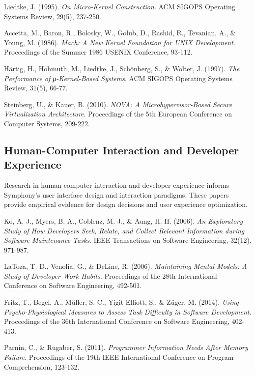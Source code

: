 \begin{compactlist}
    \item Liedtke, J. (1995). \textit{On Micro-Kernel Construction}. ACM SIGOPS Operating Systems Review, 29(5), 237-250.
    \item Accetta, M., Baron, R., Bolosky, W., Golub, D., Rashid, R., Tevanian, A., \& Young, M. (1986). \textit{Mach: A New Kernel Foundation for UNIX Development}. Proceedings of the Summer 1986 USENIX Conference, 93-112.
    \item Härtig, H., Hohmuth, M., Liedtke, J., Schönberg, S., \& Wolter, J. (1997). \textit{The Performance of μ-Kernel-Based Systems}. ACM SIGOPS Operating Systems Review, 31(5), 66-77.
    \item Steinberg, U., \& Kauer, B. (2010). \textit{NOVA: A Microhypervisor-Based Secure Virtualization Architecture}. Proceedings of the 5th European Conference on Computer Systems, 209-222.
\end{compactlist}

\subsection*{Human-Computer Interaction and Developer Experience}

Research in human-computer interaction and developer experience informs Symphony's user interface design and interaction paradigms. These papers provide empirical evidence for design decisions and user experience optimization.

\begin{compactlist}
    \item Ko, A. J., Myers, B. A., Coblenz, M. J., \& Aung, H. H. (2006). \textit{An Exploratory Study of How Developers Seek, Relate, and Collect Relevant Information during Software Maintenance Tasks}. IEEE Transactions on Software Engineering, 32(12), 971-987.
    \item LaToza, T. D., Venolia, G., \& DeLine, R. (2006). \textit{Maintaining Mental Models: A Study of Developer Work Habits}. Proceedings of the 28th International Conference on Software Engineering, 492-501.
    \item Fritz, T., Begel, A., Müller, S. C., Yigit-Elliott, S., \& Züger, M. (2014). \textit{Using Psycho-Physiological Measures to Assess Task Difficulty in Software Development}. Proceedings of the 36th International Conference on Software Engineering, 402-413.
    \item Parnin, C., \& Rugaber, S. (2011). \textit{Programmer Information Needs After Memory Failure}. Proceedings of the 19th IEEE International Conference on Program Comprehension, 123-132.
\end{compactlist}

